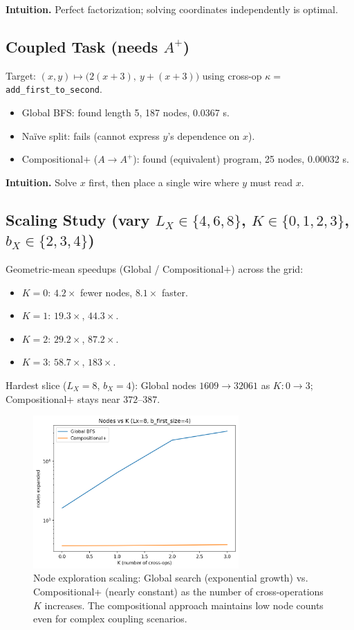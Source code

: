 \documentclass[11pt]{article}
\begin{document}
\textbf{Intuition.} Perfect factorization; solving coordinates independently is optimal.

\subsection{Coupled Task (needs $A^{+}$)}

Target: $(x,y)\mapsto\big(2(x+3),\ y+(x+3)\big)$ using cross-op $\kappa=$ \texttt{add\_first\_to\_second}.
\begin{itemize}
    \item Global BFS: found length 5, 187 nodes, 0.0367 s.
    \item Naïve split: fails (cannot express $y$'s dependence on $x$).
    \item Compositional+ ($A\to A^{+}$): found (equivalent) program, 25 nodes, 0.00032 s.
\end{itemize}

\textbf{Intuition.} Solve $x$ first, then place a single wire where $y$ must read $x$.

\subsection{Scaling Study (vary $L_X\in\{4,6,8\}$, $K\in\{0,1,2,3\}$, $b_X\in\{2,3,4\}$)}

Geometric-mean speedups (Global / Compositional+) across the grid:
\begin{itemize}
    \item $K=0$: $4.2\times$ fewer nodes, $8.1\times$ faster.
    \item $K=1$: $19.3\times$, $44.3\times$.
    \item $K=2$: $29.2\times$, $87.2\times$.
    \item $K=3$: $58.7\times$, $183\times$.
\end{itemize}

Hardest slice ($L_X=8$, $b_X=4$):
Global nodes $1609 \to 32061$ as $K:0\to3$; Compositional+ stays near $372$--$387$.

\begin{figure}[h]
\centering
\includegraphics[width=0.7\textwidth]{nodes_vs_k_scaling.png}
\caption{Node exploration scaling: Global search (exponential growth) vs. Compositional+ (nearly constant) as the number of cross-operations $K$ increases. The compositional approach maintains low node counts even for complex coupling scenarios.}
\label{fig:nodes_scaling}
\end{figure}
\end{document}
